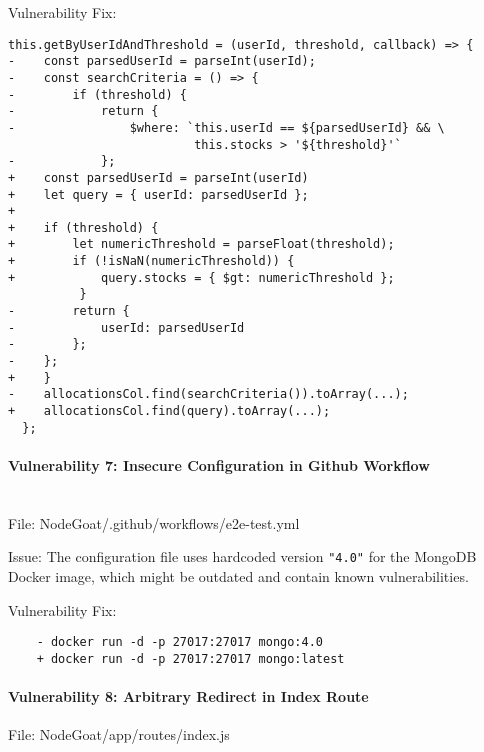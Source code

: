   Vulnerability Fix:
  
  \begin{framed}
  \begin{verbatim}
this.getByUserIdAndThreshold = (userId, threshold, callback) => {
-    const parsedUserId = parseInt(userId);
-    const searchCriteria = () => {
-        if (threshold) {
-            return {
-                $where: `this.userId == ${parsedUserId} && \
                          this.stocks > '${threshold}'`
-            };
+    const parsedUserId = parseInt(userId)
+    let query = { userId: parsedUserId };
+
+    if (threshold) {
+        let numericThreshold = parseFloat(threshold);
+        if (!isNaN(numericThreshold)) {
+            query.stocks = { $gt: numericThreshold };
          }
-        return {
-            userId: parsedUserId
-        };
-    };
+    }
-    allocationsCol.find(searchCriteria()).toArray(...);
+    allocationsCol.find(query).toArray(...);
  };
  \end{verbatim}
  \end{framed}
  
  \hypertarget{vulnerability-7-insecure-configuration-in-github-workflow}{%
  \paragraph{Vulnerability 7: Insecure Configuration in Github
  Workflow}\label{vulnerability-7-insecure-configuration-in-github-workflow}}
  \\
  File: NodeGoat/.github/workflows/e2e-test.yml
  
  Issue: The configuration file uses hardcoded version \texttt{"4.0"} for
  the MongoDB Docker image, which might be outdated and contain known
  vulnerabilities.
  
  Vulnerability Fix:
  
  \begin{verbatim}
    - docker run -d -p 27017:27017 mongo:4.0
    + docker run -d -p 27017:27017 mongo:latest
    \end{verbatim}
    
  
  \hypertarget{vulnerability-8-arbitrary-redirect-in-index-route}{%
  \paragraph{Vulnerability 8: Arbitrary Redirect in Index
  Route}\label{vulnerability-8-arbitrary-redirect-in-index-route}}
  
  File: NodeGoat/app/routes/index.js
  
